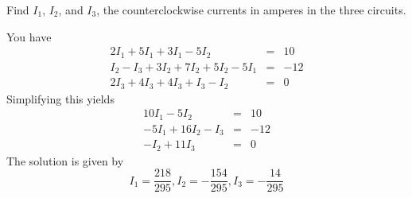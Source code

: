 \begin{enumialphparenastyle}
\begin{ex}
Find $I_{1}$, $I_{2}$, and $I_{3}$, the counterclockwise currents in
amperes in the three circuits.

\begin{sol}
You
have
\begin{eqnarray*}
2I_{1}+5I_{1}+3I_{1}-5I_{2} &=& 10 \\
I_{2}- I_{3} +3I_{2}+7I_{2}+5I_{2}-5I_{1}  &=&-12 \\
2I_{3}+4I_{3}+4I_{3}+I_{3}-I_{2} &=& 0
\end{eqnarray*}
Simplifying this yields
\begin{eqnarray*}
10I_{1}-5I_{2} &=& 10 \\
-5I_{1} + 16I_{2}- I_{3} &=&-12 \\
-I_{2} + 11I_{3} &=&0
\end{eqnarray*}
The solution is given by 
\[
I_{1}=\frac{218}{295},I_{2}=-\frac{154}{295},I_{3}=-\frac{14}{295}
\]

\end{sol}
\end{ex}

\end{enumialphparenastyle}
